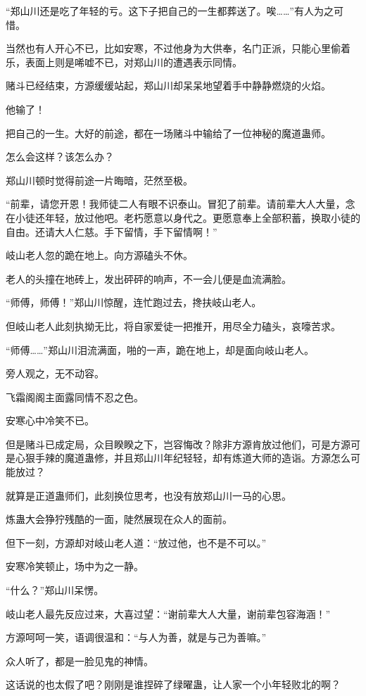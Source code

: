 \begin{this_body}
“郑山川还是吃了年轻的亏。这下子把自己的一生都葬送了。唉……”有人为之可惜。

当然也有人开心不已，比如安寒，不过他身为大供奉，名门正派，只能心里偷着乐，表面上则是唏嘘不已，对郑山川的遭遇表示同情。

赌斗已经结束，方源缓缓站起，郑山川却呆呆地望着手中静静燃烧的火焰。

他输了！

把自己的一生。大好的前途，都在一场赌斗中输给了一位神秘的魔道蛊师。

怎么会这样？该怎么办？

郑山川顿时觉得前途一片晦暗，茫然至极。

“前辈，请您开恩！我师徒二人有眼不识泰山。冒犯了前辈。请前辈大人大量，念在小徒还年轻，放过他吧。老朽愿意以身代之。更愿意奉上全部积蓄，换取小徒的自由。还请大人仁慈。手下留情，手下留情啊！”

岐山老人忽的跪在地上。向方源磕头不休。

老人的头撞在地砖上，发出砰砰的响声，不一会儿便是血流满脸。

“师傅，师傅！”郑山川惊醒，连忙跑过去，搀扶岐山老人。

但岐山老人此刻执拗无比，将自家爱徒一把推开，用尽全力磕头，哀嚎苦求。

“师傅……”郑山川泪流满面，啪的一声，跪在地上，却是面向岐山老人。

旁人观之，无不动容。

飞霜阁阁主面露同情不忍之色。

安寒心中冷笑不已。

但是赌斗已成定局，众目睽睽之下，岂容悔改？除非方源肯放过他们，可是方源可是心狠手辣的魔道蛊修，并且郑山川年纪轻轻，却有炼道大师的造诣。方源怎么可能放过？

就算是正道蛊师们，此刻换位思考，也没有放郑山川一马的心思。

炼蛊大会狰狞残酷的一面，陡然展现在众人的面前。

但下一刻，方源却对岐山老人道：“放过他，也不是不可以。”

安寒冷笑顿止，场中为之一静。

“什么？”郑山川呆愣。

岐山老人最先反应过来，大喜过望：“谢前辈大人大量，谢前辈包容海涵！”

方源呵呵一笑，语调很温和：“与人为善，就是与己为善嘛。”

众人听了，都是一脸见鬼的神情。

这话说的也太假了吧？刚刚是谁捏碎了绿曜蛊，让人家一个小年轻败北的啊？


\end{this_body}
